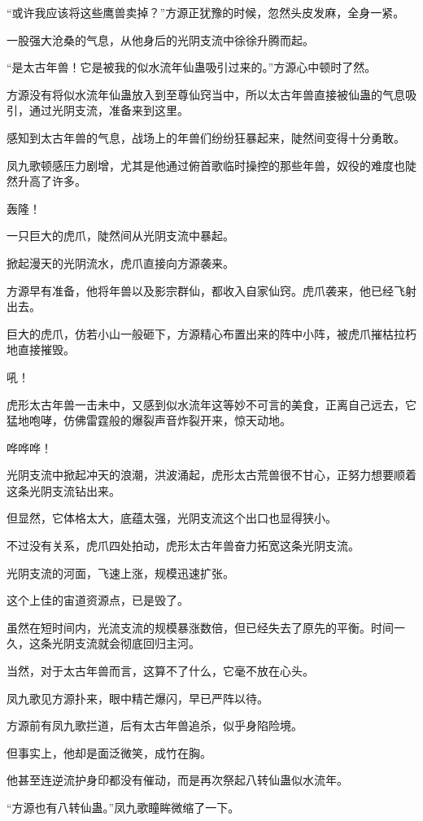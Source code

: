 \begin{this_body}
“或许我应该将这些鹰兽卖掉？”方源正犹豫的时候，忽然头皮发麻，全身一紧。

一股强大沧桑的气息，从他身后的光阴支流中徐徐升腾而起。

“是太古年兽！它是被我的似水流年仙蛊吸引过来的。”方源心中顿时了然。

方源没有将似水流年仙蛊放入到至尊仙窍当中，所以太古年兽直接被仙蛊的气息吸引，通过光阴支流，准备来到这里。

感知到太古年兽的气息，战场上的年兽们纷纷狂暴起来，陡然间变得十分勇敢。

凤九歌顿感压力剧增，尤其是他通过俯首歌临时操控的那些年兽，奴役的难度也陡然升高了许多。

轰隆！

一只巨大的虎爪，陡然间从光阴支流中暴起。

掀起漫天的光阴流水，虎爪直接向方源袭来。

方源早有准备，他将年兽以及影宗群仙，都收入自家仙窍。虎爪袭来，他已经飞射出去。

巨大的虎爪，仿若小山一般砸下，方源精心布置出来的阵中小阵，被虎爪摧枯拉朽地直接摧毁。

吼！

虎形太古年兽一击未中，又感到似水流年这等妙不可言的美食，正离自己远去，它猛地咆哮，仿佛雷霆般的爆裂声音炸裂开来，惊天动地。

哗哗哗！

光阴支流中掀起冲天的浪潮，洪波涌起，虎形太古荒兽很不甘心，正努力想要顺着这条光阴支流钻出来。

但显然，它体格太大，底蕴太强，光阴支流这个出口也显得狭小。

不过没有关系，虎爪四处拍动，虎形太古年兽奋力拓宽这条光阴支流。

光阴支流的河面，飞速上涨，规模迅速扩张。

这个上佳的宙道资源点，已是毁了。

虽然在短时间内，光流支流的规模暴涨数倍，但已经失去了原先的平衡。时间一久，这条光阴支流就会彻底回归主河。

当然，对于太古年兽而言，这算不了什么，它毫不放在心头。

凤九歌见方源扑来，眼中精芒爆闪，早已严阵以待。

方源前有凤九歌拦道，后有太古年兽追杀，似乎身陷险境。

但事实上，他却是面泛微笑，成竹在胸。

他甚至连逆流护身印都没有催动，而是再次祭起八转仙蛊似水流年。

“方源也有八转仙蛊。”凤九歌瞳眸微缩了一下。


\end{this_body}

